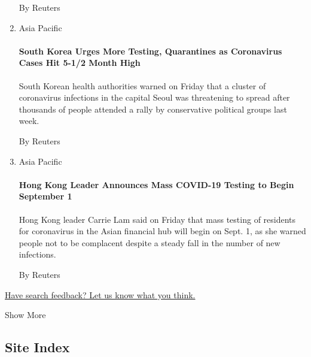 \begin{enumerate}
  By Reuters
\item
  Asia Pacific

  \href{/reuters/2020/08/21/world/asia/21reuters-health-coronavirus-southkorea.html?searchResultPosition=9}{}

  \hypertarget{south-korea-urges-more-testing-quarantines-as-coronavirus-cases-hit-5-12-month-high}{%
  \paragraph{South Korea Urges More Testing, Quarantines as Coronavirus
  Cases Hit 5-1/2 Month
  High}\label{south-korea-urges-more-testing-quarantines-as-coronavirus-cases-hit-5-12-month-high}}

  South Korean health authorities warned on Friday that a cluster of
  coronavirus infections in the capital Seoul was threatening to spread
  after thousands of people attended a rally by conservative political
  groups last week.

  By Reuters
\item
  Asia Pacific

  \href{/reuters/2020/08/21/world/asia/21reuters-health-coronavirus-hongkong.html?searchResultPosition=10}{}

  \hypertarget{hong-kong-leader-announces-mass-covid-19-testing-to-begin-september-1}{%
  \paragraph{Hong Kong Leader Announces Mass COVID-19 Testing to Begin
  September
  1}\label{hong-kong-leader-announces-mass-covid-19-testing-to-begin-september-1}}

  Hong Kong leader Carrie Lam said on Friday that mass testing of
  residents for coronavirus in the Asian financial hub will begin on
  Sept. 1, as she warned people not to be complacent despite a steady
  fall in the number of new infections.

  By Reuters
\end{enumerate}

\href{http://nyt.qualtrics.com/jfe/form/SV_ehZpyzWtbwO9HVj?v=a}{Have
search feedback? Let us know what you think.}

Show More

\hypertarget{site-index}{%
\subsection{Site Index}\label{site-index}}


